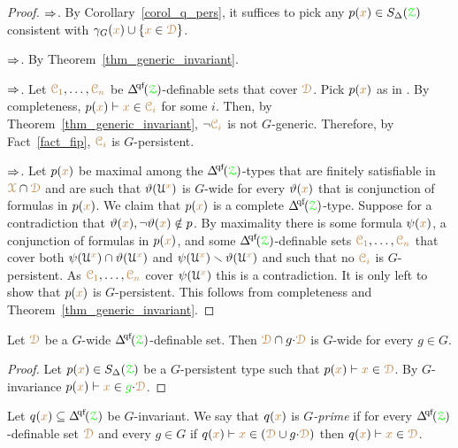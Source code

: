 \begin{proof}
  $\Rightarrow$.
  By Corollary~\ref{corol_q_pers}, it suffices to pick any $p({\color{brown} x})\in S_\Delta({\color{green}\EuScript Z})$ consistent with $\gamma_G({\color{brown} x})\cup\{{\color{brown} x}\in{\color{brown}\EuScript D}\}$.

  $\Rightarrow$.
  By Theorem~\ref{thm_generic_invariant}.

  $\Rightarrow$.
  Let ${\color{brown}\EuScript C_1},\dots,{\color{brown}\EuScript C_n}$ be $\qfDelta({\grZ})$-definable sets that cover ${\color{brown}\EuScript D}$.
  Pick $p({\color{brown} x})$ as in .
  By completeness, $p({\color{brown} x})\vdash {\color{brown}x}\in{\color{brown}\EuScript C_i}$ for some $i$.
  Then, by Theorem~\ref{thm_generic_invariant}, $\neg{\color{brown}\EuScript C_i}$ is not $G$-generic.
  Therefore, by Fact~\ref{fact_fip}, ${\color{brown}\EuScript C_i}$ is $G$-persistent.

  $\Rightarrow$.
  Let $p({\color{brown} x})$ be maximal among the $\qfDelta({\grZ})$-types that are finitely satisfiable in ${\color{brown}\EuScript X}\cap{\color{brown}\EuScript D}$ and are such that $\vartheta(\EuScript U^{\color{brown} x})$ is $G$-wide for every $\vartheta({\color{brown} x})$ that is conjunction of formulas in $p({\color{brown} x})$.
  We claim that $p({\color{brown} x})$ is a complete $\qfDelta({\grZ})$-type.
  Suppose for a contradiction that $\vartheta({\color{brown} x}),\neg\vartheta({\color{brown} x})\notin p$.
  By maximality there is some formula $\psi({\color{brown} x})$, a conjunction of formulas in $p({\color{brown} x})$, and some $\qfDelta({\grZ})$-definable sets ${\color{brown}\EuScript C_1},\dots,{\color{brown}\EuScript C_n}$ that cover both $\psi(\EuScript U^{\color{brown} x})\cap\vartheta(\EuScript U^{\color{brown} x})$ and $\psi(\EuScript U^{\color{brown} x})\smallsetminus\vartheta(\EuScript U^{\color{brown} x})$ and such that no ${\color{brown}\EuScript C_i}$ is $G$-persistent.
  As ${\color{brown}\EuScript C_1},\dots,{\color{brown}\EuScript C_n}$ cover $\psi(\EuScript U^{\color{brown} x})$ this is a contradiction.
  It is only left to show that $p({\color{brown} x})$ is $G$-persistent.
  This follows from completeness and Theorem~\ref{thm_generic_invariant}.
\end{proof}

\begin{corollary}\label{corol_intersectionGwide}
  Let ${\color{brown}\EuScript D}$ be a $G$-wide $\qfDelta(\grZ)$-definable set.
  Then ${\color{brown}\EuScript D}\cap g{\cdot}{\color{brown}\EuScript D}$ is $G$-wide for every $g\in G$.
\end{corollary}

\begin{proof}
  Let $p({\color{brown} x})\in S_\Delta({\color{green}\EuScript Z})$ be a $G$-persistent type such that $p({\color{brown} x})\vdash{\color{brown}x}\in{\color{brown}\EuScript D}$.
  By $G$-invariance $p({\color{brown} x})\vdash{\color{brown}x}\in{\color{green}g}{\cdot}{\color{brown}\EuScript D}$. 
\end{proof}

Let $q({\mr x})\subseteq\qfDelta(\grZ)$ be $G$-invariant.
We say that $q({\color{brown} x})$ is \emph{$G$-prime\/} if for every $\qfDelta(\grZ)$-definable set ${\color{brown}\EuScript D}$ and every $g\in G$ if $q({\color{brown} x})\vdash{\color{brown}x}\in({\color{brown}\EuScript D}\cup g{\cdot}{\color{brown}\EuScript D})$ then $q({\color{brown} x})\vdash{\color{brown}x}\in{\color{brown}\EuScript D}$.

